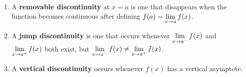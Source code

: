 \documentclass[../mathNotesPreamble]{subfiles}
\begin{document}
  \begin{defn*}\ 
    \begin{enumerate}[label=,itemsep=\stretch{1}]
      \item A \textbf{removable discontinuity} at $x=a$ is one that disappears when the function becomes continuous after defining $f(a)=\displaystyle\lim_{x \to a} f(x)$.
      \item A \textbf{jump discontinuity} is one that occurs whenever $\displaystyle\lim_{x \to a^-} f(x)$ and $\displaystyle\lim_{x \to a^+} f(x)$ both exist, but $\displaystyle\lim_{x \to a^-} f(x)\neq\lim_{x \to a^+} f(x)$.
      \item A \textbf{vertical discontinuity} occurs whenever $f(x)$ has a vertical asymptote.
    \end{enumerate}
  \end{defn*}
\end{document}
